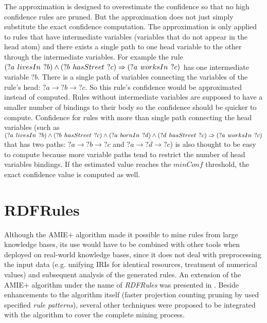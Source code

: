 The approximation is designed to overestimate the confidence so that no high confidence rules are pruned. But the approximation does not just simply substitute the exact confidence computation. The approximation is only applied to rules that have intermediate variables (variables that do not appear in the head atom) and there exists a single path to one head variable to the other through the intermediate variables. For example the rule $(?a\hspace{0.4em}livesIn\hspace{0.4em}?b) \land (?b\hspace{0.4em}hasStreet\hspace{0.4em}?c) \Rightarrow (?a\hspace{0.4em}worksIn\hspace{0.4em}?c)$ has one intermediate variable $?b$. There is a single path of variables connecting the variables of the rule's head: $?a \rightarrow ?b \rightarrow ?c$. So this rule's confidence would be approximated instead of computed. Rules without intermediate variables are supposed to have a smaller number of bindings to their body so the confidence should be quicker to compute. Confidence for rules with more than single path connecting the head variables (such as $(?a\hspace{0.4em}livesIn\hspace{0.4em}?b) \land (?b\hspace{0.4em}hasStreet\hspace{0.4em}?c) \land (?a\hspace{0.4em}bornIn\hspace{0.4em}?d) \land (?d\hspace{0.4em}hasStreet\hspace{0.4em}?c)\Rightarrow (?a\hspace{0.4em}worksIn\hspace{0.4em}?c)$ that has two paths: $?a \rightarrow ?b \rightarrow ?c$ and $?a \rightarrow ?d \rightarrow ?c$) is also thought to be easy to compute because more variable paths tend to restrict the number of head variables bindings. If the estimated value reaches the $minConf$ threshold, the exact confidence value is computed as well.

\section{RDFRules}

Although the AMIE+ algorithm made it possible to mine rules from large knowledge bases, its use would have to be combined with other tools when deployed on real-world knowledge bases, since it does not deal with preprocessing the input data (e.g. unifying IRIs for identical resources, treatment of numerical values) and subsequent analysis of the generated rules. An extension of the AMIE+ algorithm under the name of \textit{RDFRules} was presented in \cite{Zeman2020}. Beside enhancements to the algorithm itself (faster projection counting pruning by used specified \textit{rule patterns}), several other techniques were proposed to be integrated with the algorithm to cover the complete mining process.

